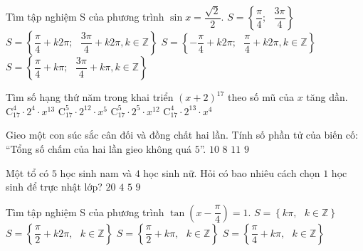 \begin{ex}%
	Tìm tập nghiệm S của phương trình $\sin x=\dfrac{\sqrt{2}}{2}$.
	\choice
	{$S=\left\{\dfrac{\pi}{4};\text{ }\dfrac{3\pi}{4} \right\}$}
	{\True $S=\left\{\dfrac{\pi}{4}+k2\pi;\text{ }\dfrac{3\pi}{4}+k2\pi, k\in \mathbb{Z} \right\}$}
	{$S=\left\{-\dfrac{\pi }{4}+k2\pi;\text{ }\dfrac{\pi}{4}+k2\pi, k\in \mathbb{Z} \right\}$}
	{$S=\left\{\dfrac{\pi}{4}+k\pi;\text{ }\dfrac{3\pi}{4}+k\pi, k\in \mathbb{Z} \right\}$}
\end{ex}
\begin{ex}%
	Tìm số hạng thứ năm trong khai triển $(x+2)^{17}$ theo số mũ của $x$ tăng dần.
	\choice
	{$\mathrm{C}_{17}^4\cdot 2^4\cdot x^{13}$}
	{$\mathrm{C}_{17}^5\cdot 2^{12}\cdot x^5$}
	{$\mathrm{C}_{17}^5\cdot 2^5\cdot x^{12}$}
	{\True $\mathrm{C}_{17}^4\cdot 2^{13}\cdot x^4$}
\end{ex}
\begin{ex}%
	Gieo một con súc sắc cân đối và đồng chất hai lần. Tính số phần tử của biến cố: “Tổng số chấm của hai lần gieo không quá $5$”.
	\choice
	{\True $10$}
	{$8$}
	{$11$}
	{$9$}
\end{ex}
\begin{ex}%
	Một tổ có $5$ học sinh nam và $4$ học sinh nữ. Hỏi có bao nhiêu cách chọn $1$ học sinh để trực nhật lớp?
	\choice
	{$20$}
	{$4$}
	{$5$}
	{\True $9$}
\end{ex}
\begin{ex}%
	Tìm tập nghiệm S của phương trình $\tan \left( x-\dfrac{\pi }{4} \right)=1$.
	\choice
	{$S=\left\{ k\pi, \text{ } k\in \mathbb{Z} \right\}$}
	{$S=\left\{ \dfrac{\pi}{2}+k2\pi, \text{ } k\in \mathbb{Z} \right\}$}
	{\True $S=\left\{ \dfrac{\pi}{2}+k\pi, \text{ } k\in \mathbb{Z} \right\}$}
	{$S=\left\{ \dfrac{\pi}{4}+k\pi, \text{ } k\in \mathbb{Z} \right\}$}
\end{ex}
